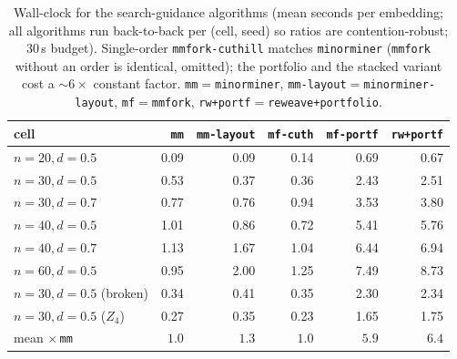 \documentclass[acmsmall,anonymous,nonacm]{acmart}
\begin{document}
\begin{table}[t]
\caption{Wall-clock for the search-guidance algorithms (mean seconds per embedding;
all algorithms run back-to-back per (cell, seed) so ratios are contention-robust;
$30$\,s budget). Single-order \texttt{mmfork-cuthill} matches \texttt{minorminer}
(\texttt{mmfork} without an order is identical, omitted); the portfolio and the
stacked variant cost a ${\sim}6\times$ constant factor.
\texttt{mm}${=}$\texttt{minorminer}, \texttt{mm-layout}${=}$\texttt{minorminer-layout},
\texttt{mf}${=}$\texttt{mmfork}, \texttt{rw+portf}${=}$\texttt{reweave+portfolio}.}
\label{tab:fgtime}
\small
\begin{tabular}{lrrrrr}
\toprule
cell & \texttt{mm} & \texttt{mm-layout} & \texttt{mf-cuth} & \texttt{mf-portf} & \texttt{rw+portf} \\
\midrule
$n{=}20,d{=}0.5$         & 0.09 & 0.09 & 0.14 & 0.69 & 0.67 \\
$n{=}30,d{=}0.5$         & 0.53 & 0.37 & 0.36 & 2.43 & 2.51 \\
$n{=}30,d{=}0.7$         & 0.77 & 0.76 & 0.94 & 3.53 & 3.80 \\
$n{=}40,d{=}0.5$         & 1.01 & 0.86 & 0.72 & 5.41 & 5.76 \\
$n{=}40,d{=}0.7$         & 1.13 & 1.67 & 1.04 & 6.44 & 6.94 \\
$n{=}60,d{=}0.5$         & 0.95 & 2.00 & 1.25 & 7.49 & 8.73 \\
$n{=}30,d{=}0.5$ (broken)& 0.34 & 0.41 & 0.35 & 2.30 & 2.34 \\
$n{=}30,d{=}0.5$ ($Z_4$) & 0.27 & 0.35 & 0.23 & 1.65 & 1.75 \\
\midrule
mean $\times$\,\texttt{mm} & $1.0$ & $1.3$ & $1.0$ & $5.9$ & $6.4$ \\
\bottomrule
\end{tabular}
\end{table}
\end{document}
